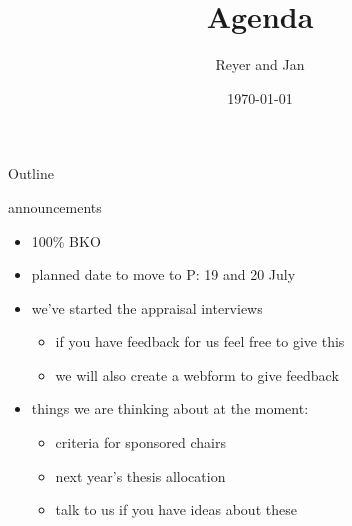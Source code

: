 \documentclass[presentation]{beamer}
\author{Reyer and Jan}
\date{\today}
\title{Agenda}
\begin{document}
\begin{frame}{Outline}
\tableofcontents
\end{frame}





\begin{frame}[label={sec:org3af1b58}]{announcements}
\begin{itemize}
\item 100\% BKO
\item planned date to move to P: 19 and 20 July
\item we've started the appraisal interviews
\begin{itemize}
\item if you have feedback for us feel free to give this
\item we will also create a webform to give feedback
\end{itemize}
\item things we are thinking about at the moment:
\begin{itemize}
\item criteria for sponsored chairs
\item next year's thesis allocation
\item talk to us if you have ideas about these
\end{itemize}
\end{itemize}
\end{frame}
\end{document}
